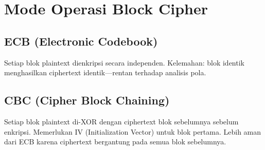 \section{Mode Operasi Block Cipher}

\subsection{ECB (Electronic Codebook)}
Setiap blok plaintext dienkripsi secara independen. Kelemahan: blok identik menghasilkan ciphertext identik---rentan terhadap analisis pola.

\subsection{CBC (Cipher Block Chaining)}
Setiap blok plaintext di-XOR dengan ciphertext blok sebelumnya sebelum enkripsi. Memerlukan IV (Initialization Vector) untuk blok pertama. Lebih aman dari ECB karena ciphertext bergantung pada semua blok sebelumnya.
